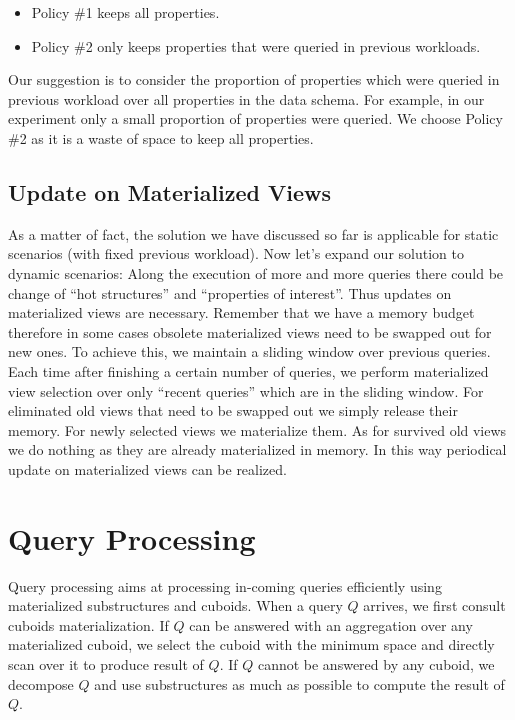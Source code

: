 \begin{itemize}
\item Policy \#1 keeps all properties.
\item Policy \#2 only keeps properties that were queried in previous workloads.
\end{itemize}

Our suggestion is to consider the proportion of properties which were queried in previous workload over all properties in the data schema. For example, in our experiment only a small proportion of properties were queried. We choose Policy \#2 as it is a waste of space to keep all properties. 


\subsection{Update on Materialized Views}
As a matter of fact, the solution we have discussed so far is applicable for static scenarios (with fixed previous workload). Now let's expand our solution to dynamic scenarios: Along the execution of more and more queries there could be change of ``hot structures'' and ``properties of interest''. Thus updates on materialized views are necessary. Remember that we have a memory budget therefore in some cases obsolete materialized views need to be swapped out for new ones. To achieve this, we maintain a sliding window over previous queries. Each time after finishing a certain number of queries, we perform materialized view selection over only ``recent queries'' which are in the sliding window. For eliminated old views that need to be swapped out we simply release their memory. For newly selected views we materialize them. As for survived old views we do nothing as they are already materialized in memory. In this way periodical update on materialized views can be realized. 


\section{Query Processing}
\label{Future Query Processing Part}
Query processing aims at processing in-coming queries efficiently using materialized substructures and cuboids. When a query $Q$ arrives, we first consult cuboids materialization. If $Q$ can be answered with an aggregation over any materialized cuboid, we select the cuboid with the minimum space and directly scan over it to produce result of $Q$. If $Q$ cannot be answered by any cuboid, we decompose $Q$ and use substructures as much as possible to compute the result of $Q$. 

